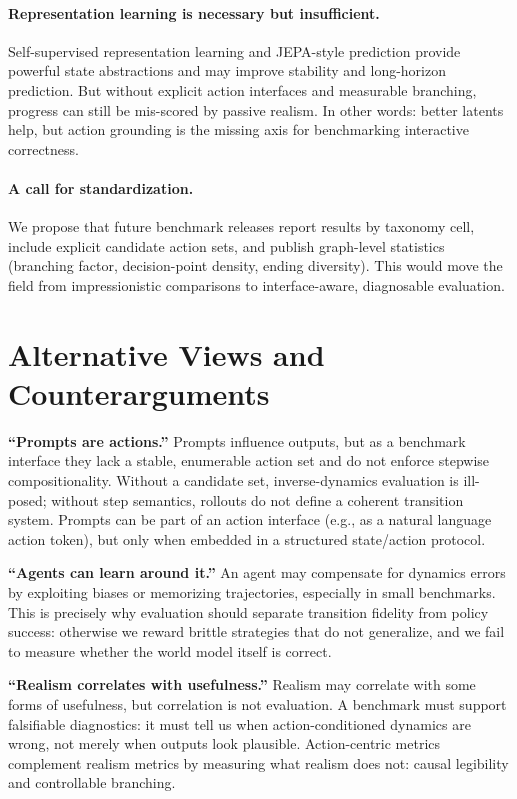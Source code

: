 \documentclass{article}
\theoremstyle{plain}
\theoremstyle{definition}
\theoremstyle{remark}
\begin{document}
\paragraph{Representation learning is necessary but insufficient.}
Self-supervised representation learning and JEPA-style prediction \cite{lecun2022path,assran2023ijepa,bardes2024vjepa} provide powerful state abstractions and may improve stability and long-horizon prediction. But without explicit action interfaces and measurable branching, progress can still be mis-scored by passive realism. In other words: better latents help, but action grounding is the missing axis for benchmarking interactive correctness.

\paragraph{A call for standardization.}
We propose that future benchmark releases report results by taxonomy cell, include explicit candidate action sets, and publish graph-level statistics (branching factor, decision-point density, ending diversity). This would move the field from impressionistic comparisons to interface-aware, diagnosable evaluation.

\section{Alternative Views and Counterarguments}
\textbf{``Prompts are actions.''}
Prompts influence outputs, but as a benchmark interface they lack a stable, enumerable action set and do not enforce stepwise compositionality. Without a candidate set, inverse-dynamics evaluation is ill-posed; without step semantics, rollouts do not define a coherent transition system. Prompts can be part of an action interface (e.g., as a natural language action token), but only when embedded in a structured state/action protocol.

\textbf{``Agents can learn around it.''}
An agent may compensate for dynamics errors by exploiting biases or memorizing trajectories, especially in small benchmarks. This is precisely why evaluation should separate transition fidelity from policy success: otherwise we reward brittle strategies that do not generalize, and we fail to measure whether the world model itself is correct.

\textbf{``Realism correlates with usefulness.''}
Realism may correlate with some forms of usefulness, but correlation is not evaluation. A benchmark must support falsifiable diagnostics: it must tell us when action-conditioned dynamics are wrong, not merely when outputs look plausible. Action-centric metrics complement realism metrics by measuring what realism does not: causal legibility and controllable branching.
\end{document}
